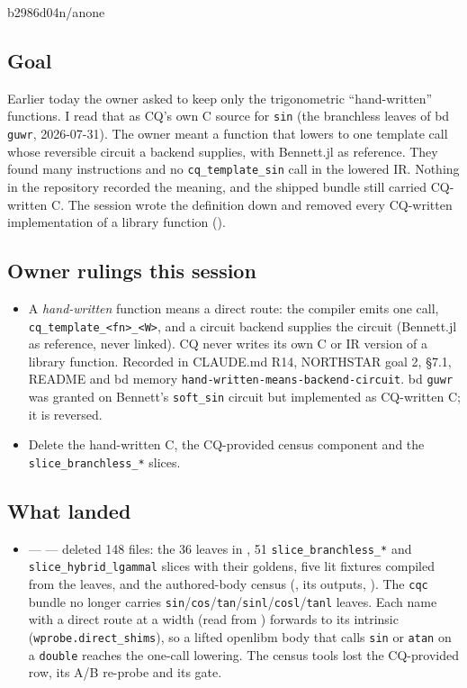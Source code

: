%
  {b2986d04}{n/a}{none}

\subsection*{Goal}
Earlier today the owner asked to keep only the trigonometric ``hand-written'' functions.
I read that as CQ's own C source for \texttt{sin} (the branchless leaves of bd \texttt{guwr},
2026-07-31). The owner meant a function that lowers to one template call whose reversible
circuit a backend supplies, with Bennett.jl as reference. They found many instructions and no
\texttt{cq\_template\_sin} call in the lowered IR. Nothing in the repository recorded the meaning,
and the shipped bundle still carried CQ-written C. The session wrote the definition down and
removed every CQ-written implementation of a library function ().

\subsection*{Owner rulings this session}
\begin{itemize}
  \item A \emph{hand-written} function means a direct route: the compiler emits one call,
  \texttt{cq\_template\_<fn>\_<W>}, and a circuit backend supplies the circuit (Bennett.jl as
  reference, never linked). CQ never writes its own C or IR version of a library function.
  Recorded in CLAUDE.md R14, NORTHSTAR goal 2,  \S7.1, README and bd
  memory \texttt{hand-written-means-backend-circuit}. bd \texttt{guwr} was granted on Bennett's
  \texttt{soft\_sin} circuit but implemented as CQ-written C; it is reversed.
  \item Delete the hand-written C, the CQ-provided census component and the
  \texttt{slice\_branchless\_*} slices.
\end{itemize}

\subsection*{What landed}
\begin{itemize}
  \item {} ---  --- deleted 148 files: the 36 leaves in
  , 51 \texttt{slice\_branchless\_*} and
  \texttt{slice\_hybrid\_lgammal} slices with their goldens, five lit fixtures compiled from the
  leaves, and the authored-body census (, its outputs,
  ). The \texttt{cqc} bundle no longer carries
  \texttt{sin}/\texttt{cos}/\texttt{tan}/\texttt{sinl}/\texttt{cosl}/\texttt{tanl} leaves. Each
  name with a direct route at a width (read from ) forwards to
  its intrinsic (\texttt{wprobe.direct\_shims}), so a lifted openlibm body that calls
  \texttt{sin} or \texttt{atan} on a \texttt{double} reaches the one-call lowering. The census
  tools lost the CQ-provided row, its A/B re-probe and its gate.
\end{itemize}

